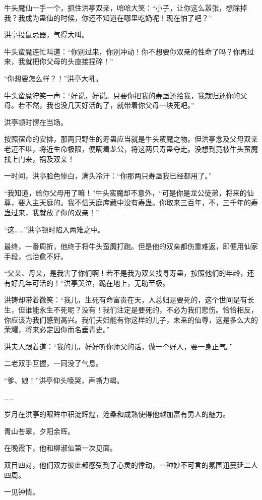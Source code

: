 \begin{this_body}
牛头魔仙一手一个，抓住洪亭双亲，哈哈大笑：“小子，让你这么嚣张，想除掉我？我成为蛊仙的时候，你还不知道在哪里吃奶呢！现在怕了吧？”

洪亭投鼠忌器，气得大叫。

牛头蛮魔连忙叫道：“你别过来，你别冲动！你不想要你双亲的性命了吗？你再过来，我就把你父母的头直接捏碎！”

“你想要怎么样？！”洪亭大吼。

牛头蛮魔狞笑一声：“好说，好说。只要你把我的寿蛊还给我，我就归还你的父母。若不然，我也没几天好活的了，就带着你父母一块死吧。”

洪亭顿时愣在当场。

按照宿命的安排，那两只野生的寿蛊应当就是牛头蛮魔之物。但洪亭念及父母双亲老迈不堪，将近生命极限，便瞒着龙公，将这两只寿蛊夺走。没想到竟被牛头蛮魔找上门来，祸及双亲！

一时间，洪亭脸色惨白，满头冷汗：“你那两只寿蛊我已经都用了。”

“我知道，给你父母用了嘛！”牛头蛮魔却不意外，“可是你是龙公徒弟，将来的仙尊，要入主天庭的。我不信天庭库藏中没有寿蛊。你取来三百年，不，三千年的寿蛊过来，我就放了你的双亲！”

“这……”洪亭顿时陷入两难之中。

最终，一番周折，他终于将牛头蛮魔打跑。但是他的双亲都伤重难返，即便用仙家手段，也治愈不好。

“父亲、母亲，是我害了你们啊！若不是我为双亲找寻寿蛊，按照他们的年龄，还有好几年可活的！”洪亭哭泣，跪在地上，无助至极。

洪铸却带着微笑：“我儿，生死有命富贵在天，人总归是要死的，这个世间是有长生，但谁能永生不死呢？没有！我们注定是要死的，不必为我们悲伤。恰恰相反，你应该为我们感到高兴。我们夫妇能有你这样的儿子，未来的仙尊，这是多么大的荣耀，将来必定因你而名垂青史。”

洪夫人跟着道：“我的儿，好好听你师父的话，做一个好人，要一身正气。”

二老双手互握，一同没了气息。

“爹、娘！”洪亭仰头嚎哭，声嘶力竭。

……

岁月在洪亭的眼眸中积淀辉煌，沧桑和成熟使得他越加富有男人的魅力。

青山苍翠，夕阳余晖。

在晚霞下，他和柳淑仙第一次见面。

双目四对，他们双方彼此都感受到了心灵的悸动，一种妙不可言的氛围迅蔓延二人四周。

一见钟情。


\end{this_body}
